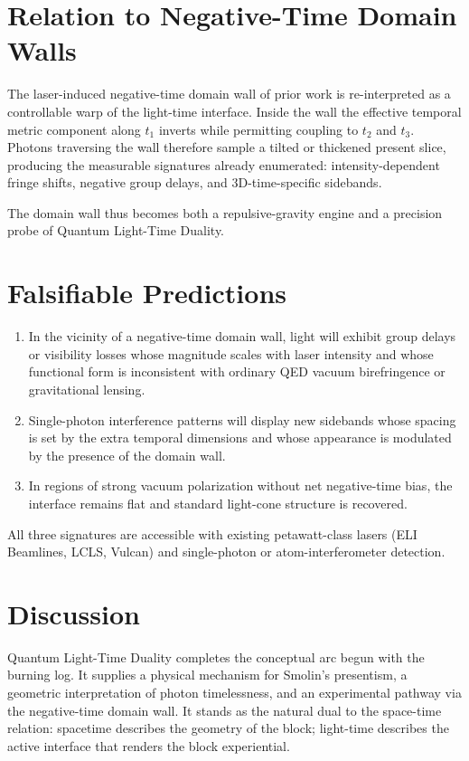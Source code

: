\documentclass[11pt,a4paper]{article}
\begin{document}
\section{Relation to Negative-Time Domain Walls}

The laser-induced negative-time domain wall of prior work is re-interpreted as a controllable warp of the light-time interface. Inside the wall the effective temporal metric component along $t_1$ inverts while permitting coupling to $t_2$ and $t_3$. Photons traversing the wall therefore sample a tilted or thickened present slice, producing the measurable signatures already enumerated: intensity-dependent fringe shifts, negative group delays, and 3D-time-specific sidebands.

The domain wall thus becomes both a repulsive-gravity engine and a precision probe of Quantum Light-Time Duality.

\section{Falsifiable Predictions}

\begin{enumerate}
    \item In the vicinity of a negative-time domain wall, light will exhibit group delays or visibility losses whose magnitude scales with laser intensity and whose functional form is inconsistent with ordinary QED vacuum birefringence or gravitational lensing.
    \item Single-photon interference patterns will display new sidebands whose spacing is set by the extra temporal dimensions and whose appearance is modulated by the presence of the domain wall.
    \item In regions of strong vacuum polarization without net negative-time bias, the interface remains flat and standard light-cone structure is recovered.
\end{enumerate}

All three signatures are accessible with existing petawatt-class lasers (ELI Beamlines, LCLS, Vulcan) and single-photon or atom-interferometer detection.

\section{Discussion}

Quantum Light-Time Duality completes the conceptual arc begun with the burning log. It supplies a physical mechanism for Smolin's presentism, a geometric interpretation of photon timelessness, and an experimental pathway via the negative-time domain wall. It stands as the natural dual to the space-time relation: spacetime describes the geometry of the block; light-time describes the active interface that renders the block experiential.
\end{document}
